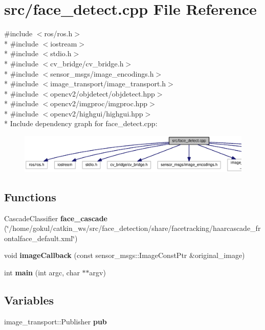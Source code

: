 \section{src/face\-\_\-detect.cpp File Reference}
\label{face__detect_8cpp}
{\ttfamily \#include $<$ros/ros.\-h$>$}\\*
{\ttfamily \#include $<$iostream$>$}\\*
{\ttfamily \#include $<$stdio.\-h$>$}\\*
{\ttfamily \#include $<$cv\-\_\-bridge/cv\-\_\-bridge.\-h$>$}\\*
{\ttfamily \#include $<$sensor\-\_\-msgs/image\-\_\-encodings.\-h$>$}\\*
{\ttfamily \#include $<$image\-\_\-transport/image\-\_\-transport.\-h$>$}\\*
{\ttfamily \#include $<$opencv2/objdetect/objdetect.\-hpp$>$}\\*
{\ttfamily \#include $<$opencv2/imgproc/imgproc.\-hpp$>$}\\*
{\ttfamily \#include $<$opencv2/highgui/highgui.\-hpp$>$}\\*
Include dependency graph for face\-\_\-detect.\-cpp\-:
\nopagebreak
\begin{figure}[H]
\begin{center}
\leavevmode
\includegraphics[width=350pt]{face__detect_8cpp__incl}
\end{center}
\end{figure}
\subsection*{Functions}
\begin{DoxyCompactItemize}
\item 
Cascade\-Classifier {\bf face\-\_\-cascade} (\char`\"{}/home/gokul/catkin\-\_\-ws/src/face\-\_\-detection/share/facetracking/haarcascade\-\_\-frontalface\-\_\-default.\-xml\char`\"{})
\item 
void {\bf image\-Callback} (const sensor\-\_\-msgs\-::\-Image\-Const\-Ptr \&original\-\_\-image)
\item 
int {\bf main} (int argc, char $\ast$$\ast$argv)
\end{DoxyCompactItemize}
\subsection*{Variables}
\begin{DoxyCompactItemize}
\item 
image\-\_\-transport\-::\-Publisher {\bf pub}
\end{DoxyCompactItemize}


